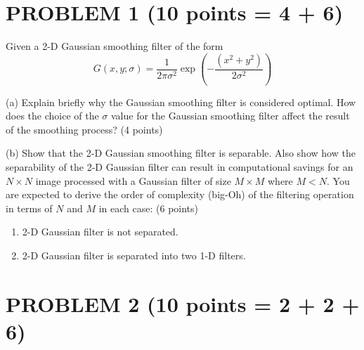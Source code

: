 \documentclass[11pt]{article}
\theoremstyle{definition}
\begin{document}
\section*{PROBLEM 1 (10 points = 4 + 6)}

Given a 2-D Gaussian smoothing filter of the form
\begin{equation}
G(x,y;\sigma)=\frac{1}{2\pi\sigma^{2}}\exp\left(-\frac{(x^{2}+y^{2})}{2\sigma^{2}}\right)
\end{equation}

(a) Explain briefly why the Gaussian smoothing filter is considered optimal. How does the choice of the $\sigma$ value for the Gaussian smoothing filter affect the result of the smoothing process? (4 points)

(b) Show that the 2-D Gaussian smoothing filter is separable. Also show how the separability of the 2-D Gaussian filter can result in computational savings for an $N \times N$ image processed with a Gaussian filter of size $M \times M$ where $M < N$. You are expected to derive the order of complexity (big-Oh) of the filtering operation in terms of $N$ and $M$ in each case: (6 points)

\begin{enumerate}[label=(\roman*)]
    \item 2-D Gaussian filter is not separated.
    \item 2-D Gaussian filter is separated into two 1-D filters.
\end{enumerate}

\vspace{1cm}
\newpage
\section*{PROBLEM 2 (10 points = 2 + 2 + 6)}
\end{document}
